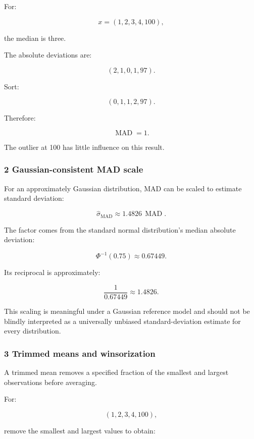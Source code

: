 For:

\[
 x=(1,2,3,4,100),
\]

the median is three.

The absolute deviations are:

\[
 (2,1,0,1,97).
\]

Sort:

\[
 (0,1,1,2,97).
\]

Therefore:

\[
 \boxed{\operatorname{MAD}=1}.
\]

The outlier at 100 has little influence on this result.

\subsubsection{2 Gaussian-consistent MAD scale}\label{02-foundations-ii-ch030-gaussian-consistent-mad-scale}

\hypertarget{02-foundations-ii-ch030-gaussian-consistent-mad-scale}{}

For an approximately Gaussian distribution, MAD can be scaled to estimate standard deviation:

\[
 \boxed{ \hat\sigma_{\mathrm{MAD}} \approx1.4826\,\operatorname{MAD} }.
\]

The factor comes from the standard normal distribution's median absolute deviation:

\[
 \Phi^{-1}(0.75)\approx0.67449.
\]

Its reciprocal is approximately:

\[
 \frac1{0.67449}\approx1.4826.
\]

This scaling is meaningful under a Gaussian reference model and should not be blindly interpreted as a universally unbiased standard-deviation estimate for every distribution.

\subsubsection{3 Trimmed means and winsorization}\label{02-foundations-ii-ch030-trimmed-means-and-winsorization}

\hypertarget{02-foundations-ii-ch030-trimmed-means-and-winsorization}{}

A trimmed mean removes a specified fraction of the smallest and largest observations before averaging.

For:

\[
 (1,2,3,4,100),
\]

remove the smallest and largest values to obtain:

